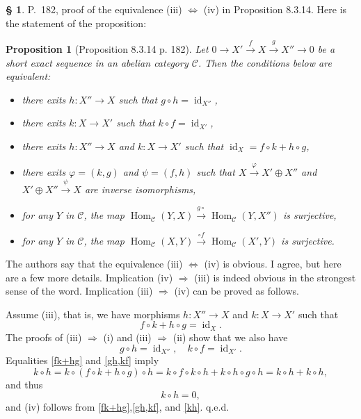 \documentclass[12pt]{article}%
\newtheorem{prop}[thm]{Proposition}
\theoremstyle{remark}
\theoremstyle{definition}
\newtheorem{s}[thm]{\S}%
\newcommand{\C}{\mathcal C}
\newcommand{\pp}{\varphi}
\newcommand{\ssi}{\Leftrightarrow}%
\newcommand{\then}{\Rightarrow}
\newcommand{\xr}{\xrightarrow}
\DeclareMathOperator{\id}{id}
\DeclareMathOperator{\Hom}{Hom}%
\begin{document}
\begin{s} 
P.~182, proof of the equivalence (iii) $\ssi$ (iv) in Proposition 8.3.14. Here is the statement of the proposition:

\begin{prop}[Proposition 8.3.14 p. 182] 
Let $0\to X'\xr fX\xr gX''\to0$ be a short exact sequence in an abelian category $\C$. Then the conditions below are equivalent:
\begin{itemize}
\item[\em(i)] there exits $h:X''\to X$ such that $g\circ h=\id_{X''}$,
\item[\em(ii)] there exits $k:X\to X'$ such that $k\circ f=\id_{X'}$,
\item[\em(iii)] there exits $h:X''\to X$ and $k:X\to X'$ such that $\id_X=f\circ k+h\circ g$,
\item[\em(iv)] there exits $\pp=(k,g)$ and $\psi=(f,h)$ such that $X\xr\pp X'\oplus X''$ and $X'\oplus X''\xr\psi X$ are inverse isomorphisms,
\item[\em(v)] for any $Y$ in $\C$, the map $\Hom_\C(Y,X)\xr{g\circ}\Hom_\C(Y,X'')$ is surjective,
\item[\em(vi)] for any $Y$ in $\C$, the map $\Hom_\C(X,Y)\xr{\circ f}\Hom_\C(X',Y)$ is surjective.
\end{itemize}
\end{prop}

The authors say that the equivalence (iii) $\ssi$ (iv) is obvious. I agree, but here are a few more details. Implication (iv) $\then$ (iii) is indeed obvious in the strongest sense of the word. Implication (iii) $\then$ (iv) can be proved as follows. 

Assume (iii), that is, we have morphisms $h:X''\to X$ and $k:X\to X'$ such that 
\begin{equation}\label{fk+hg} 
f\circ k+h\circ g=\id_X.
\end{equation} 
The proofs of (iii) $\then$ (i) and (iii) $\then$ (ii) show that we also have 
\begin{equation}\label{gh,kf} 
g\circ h=\id_{X''},\quad k\circ f=\id_{X'}.
\end{equation} 
Equalities \eqref{fk+hg} and \eqref{gh,kf} imply 
$$
k\circ h=k\circ(f\circ k+h\circ g)\circ h=k\circ f\circ k\circ h+k\circ h\circ g\circ h=k\circ h+k\circ h,
$$ 
and thus 
\begin{equation}\label{kh} 
k\circ h=0, 
\end{equation} 
and (iv) follows from \eqref{fk+hg},\eqref{gh,kf}, and \eqref{kh}. q.e.d.
\end{s}
\end{document}
